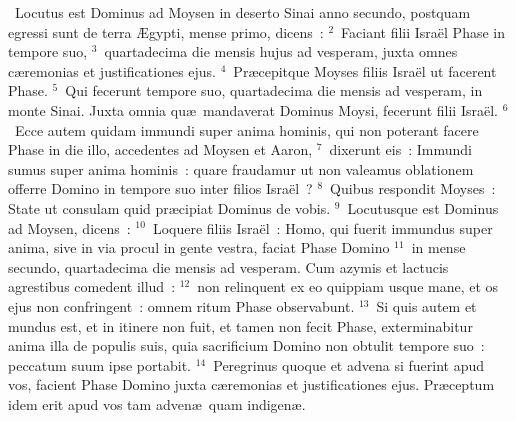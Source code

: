 ~\lettrine[lines=10,image=true,loversize=0.05,lraise=-0.03]{L}{}ocutus est Dominus ad Moysen in deserto Sinai anno secundo, postquam egressi sunt de terra \AE gypti, mense primo, dicens~:
${}^{2}$~Faciant filii Isra\"el Phase in tempore suo,
${}^{3}$~quartadecima die mensis hujus ad vesperam, juxta omnes c\ae remonias et justificationes ejus.
${}^{4}$~Pr\ae cepitque Moyses filiis Isra\"el ut facerent Phase.
${}^{5}$~Qui fecerunt tempore suo, quartadecima die mensis ad vesperam, in monte Sinai. Juxta omnia qu\ae\ mandaverat Dominus Moysi, fecerunt filii Isra\"el.
${}^{6}$~Ecce autem quidam immundi super anima hominis, qui non poterant facere Phase in die illo, accedentes ad Moysen et Aaron,
${}^{7}$~dixerunt eis~: Immundi sumus super anima hominis~: quare fraudamur ut non valeamus oblationem offerre Domino in tempore suo inter filios Isra\"el~?
${}^{8}$~Quibus respondit Moyses~: State ut consulam quid pr\ae cipiat Dominus de vobis.
${}^{9}$~Locutusque est Dominus ad Moysen, dicens~:
${}^{10}$~Loquere filiis Isra\"el~: Homo, qui fuerit immundus super anima, sive in via procul in gente vestra, faciat Phase Domino
${}^{11}$~in mense secundo, quartadecima die mensis ad vesperam. Cum azymis et lactucis agrestibus comedent illud~:
${}^{12}$~non relinquent ex eo quippiam usque mane, et os ejus non confringent~: omnem ritum Phase observabunt.
${}^{13}$~Si quis autem et mundus est, et in itinere non fuit, et tamen non fecit Phase, exterminabitur anima illa de populis suis, quia sacrificium Domino non obtulit tempore suo~: peccatum suum ipse portabit.
${}^{14}$~Peregrinus quoque et advena si fuerint apud vos, facient Phase Domino juxta c\ae remonias et justificationes ejus. Pr\ae ceptum idem erit apud vos tam adven\ae\ quam indigen\ae .


